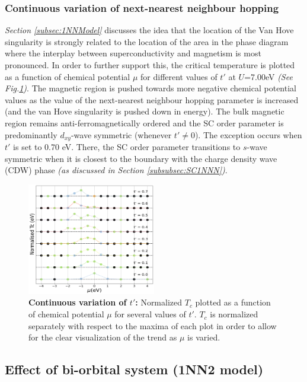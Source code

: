 \documentclass[11pt]{article}
\begin{document}
\subsubsection{Continuous variation of next-nearest neighbour hopping}


\textit{Section \ref{subsec:1NNModel}} discusses the idea that the location of the 
Van Hove singularity is strongly related to the location of the area in the phase diagram where the interplay between 
superconductivity and magnetism is most pronounced. In order to further support this, the critical temperature
is plotted as a function of chemical potential $\mu$ for different values of $t'$ at $U$=7.00eV \textit{(See Fig.\ref{fig:tprimecont})}.
The magnetic region is pushed towards more negative chemical potential values as the value of the next-nearest 
neighbour hopping parameter is increased (and the van Hove singularity is pushed down in energy). The bulk magnetic
region remains anti-ferromagnetically ordered and the SC order parameter is predominantly $d_{xy}$-wave symmetric (whenever $t' \neq 0$). The exception occurs when
$t'$ is set to 0.70 eV. There, the SC order parameter transitions to $s$-wave symmetric when it is closest to the boundary 
with the charge density wave (CDW) phase \textit{(as discussed in Section \ref{subsubsec:SC1NNN})}.

\begin{figure}[htbp]  %
    \centering
    \includegraphics[width=0.50\textwidth]{tprimecont.png}  %
    \caption{ \textbf{Continuous variation of $t'$:} Normalized $T_c$ plotted as a function of chemical 
    potential $\mu$ for several values of $t'$. $T_c$ is normalized separately with respect to the 
    maxima of each plot in order to allow for the clear visualization of the trend as $\mu$ is varied.  }
    \label{fig:tprimecont}
\end{figure}


\subsection{Effect of bi-orbital system (1NN2 model)}
\label{subsec:1NN2Model}
\end{document}
